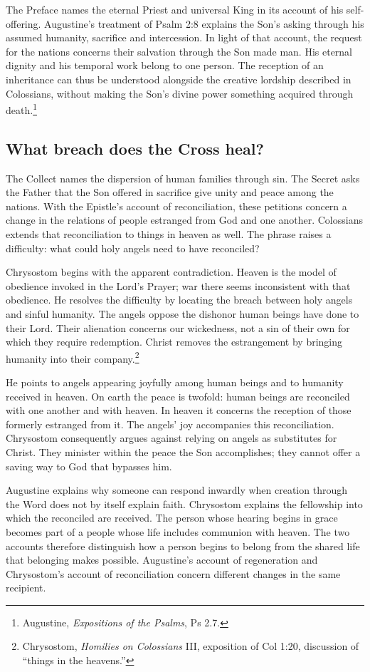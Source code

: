 The Preface names the eternal Priest and universal King in its account of his self-offering. Augustine's treatment of Psalm 2:8 explains the Son's asking through his assumed humanity, sacrifice and intercession. In light of that account, the request for the nations concerns their salvation through the Son made man. His eternal dignity and his temporal work belong to one person. The reception of an inheritance can thus be understood alongside the creative lordship described in Colossians, without making the Son's divine power something acquired through death.\footnote{Augustine, \emph{Expositions of the Psalms}, Ps 2.7.}

\subsection{What breach does the Cross heal?}
The Collect names the dispersion of human families through sin. The Secret asks the Father that the Son offered in sacrifice give unity and peace among the nations. With the Epistle's account of reconciliation, these petitions concern a change in the relations of people estranged from God and one another. Colossians extends that reconciliation to things in heaven as well. The phrase raises a difficulty: what could holy angels need to have reconciled?

Chrysostom begins with the apparent contradiction. Heaven is the model of obedience invoked in the Lord's Prayer; war there seems inconsistent with that obedience. He resolves the difficulty by locating the breach between holy angels and sinful humanity. The angels oppose the dishonor human beings have done to their Lord. Their alienation concerns our wickedness, not a sin of their own for which they require redemption. Christ removes the estrangement by bringing humanity into their company.\footnote{Chrysostom, \emph{Homilies on Colossians} III, exposition of Col 1:20, discussion of ``things in the heavens.''}

He points to angels appearing joyfully among human beings and to humanity received in heaven. On earth the peace is twofold: human beings are reconciled with one another and with heaven. In heaven it concerns the reception of those formerly estranged from it. The angels' joy accompanies this reconciliation. Chrysostom consequently argues against relying on angels as substitutes for Christ. They minister within the peace the Son accomplishes; they cannot offer a saving way to God that bypasses him.

Augustine explains why someone can respond inwardly when creation through the Word does not by itself explain faith. Chrysostom explains the fellowship into which the reconciled are received. The person whose hearing begins in grace becomes part of a people whose life includes communion with heaven. The two accounts therefore distinguish how a person begins to belong from the shared life that belonging makes possible. Augustine's account of regeneration and Chrysostom's account of reconciliation concern different changes in the same recipient.

